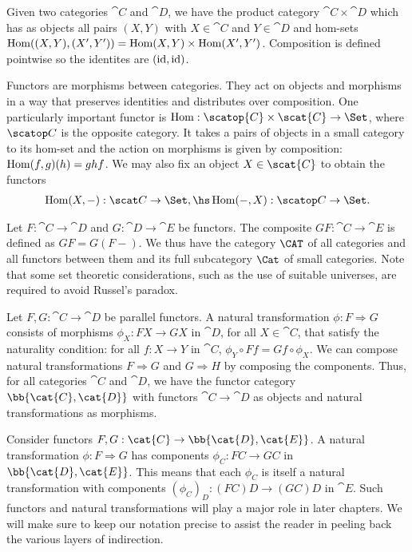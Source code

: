 Given two categories $\cat{C}$ and $\cat{D}$, we have the product category
$\cat{C}\times\cat{D}$ which has as objects all pairs $(X,Y)$ with $X\in\cat{C}$
and $Y\in\cat{D}$ and hom-sets $\operatorname{Hom}((X,Y),(X',Y'))=\operatorname{Hom}(X,Y)\times\operatorname{Hom}(X',Y')$.
Composition is defined pointwise so the identites are $(\operatorname{id},\operatorname{id})$.

Functors are morphisms between categories. They act on objects and morphisms in
a way that preserves identities and distributes over composition. One
particularly important functor is $\Hom : \scatop{C}\times\scat{C}\to\Set$,
where $\scatop C$ is the opposite category. It takes a pairs of objects in a small
category to its hom-set and the action on morphisms is given by composition:
$\operatorname{Hom}(f,g)(h) = ghf$. We may also fix an object $X\in\scat{C}$ to obtain the
functors
\begin{align*}
  \Hom(X,-):\scat C\to\Set, \hs \Hom(-,X):\scatop C\to\Set.
\end{align*}

Let $F:\cat{C}\to\cat{D}$ and $G:\cat{D}\to\cat{E}$ be functors. The composite
$GF:\cat{C}\to\cat{E}$ is defined as $GF = G(F-)$. We thus have the category
$\CAT$ of all categories and all functors between them and its full subcategory
$\Cat$ of small categories. Note that some set theoretic considerations, such
as the use of suitable universes, are required to avoid Russel's paradox.

Let $F,G:\cat{C}\to\cat{D}$ be parallel functors. A natural transformation $\phi
: F \Rightarrow G$ consists of morphisms $\phi_X : FX \to GX$ in $\cat{D}$, for
all $X\in\cat{C}$, that satisfy the naturality condition: for all $f:X\to Y$ in
$\cat{C}$, $\phi_Y\circ Ff = Gf\circ \phi_X$.
We can compose natural transformations $F\Rightarrow G$ and $G\Rightarrow H$ by
composing the components. Thus, for all categories $\cat{C}$ and $\cat{D}$, we
have the functor category $\bb{\cat{C},\cat{D}}$ with functors
$\cat{C}\to\cat{D}$ as objects and natural transformations as morphisms.

Consider functors $F,G:\cat{C}\to\bb{\cat{D},\cat{E}}$. A natural
transformation $\phi : F\Rightarrow G$ has components $\phi_C : FC\to GC$ in
$\bb{\cat{D},\cat{E}}$. This means that each $\phi_C$ is itself a natural
transformation with components $(\phi_C)_D : (FC)D \to (GC)D$ in
$\cat{E}$. Such functors and natural transformations will play a major role in
later chapters. We will make sure to keep our notation precise to assist the
reader in peeling back the various layers of indirection.

